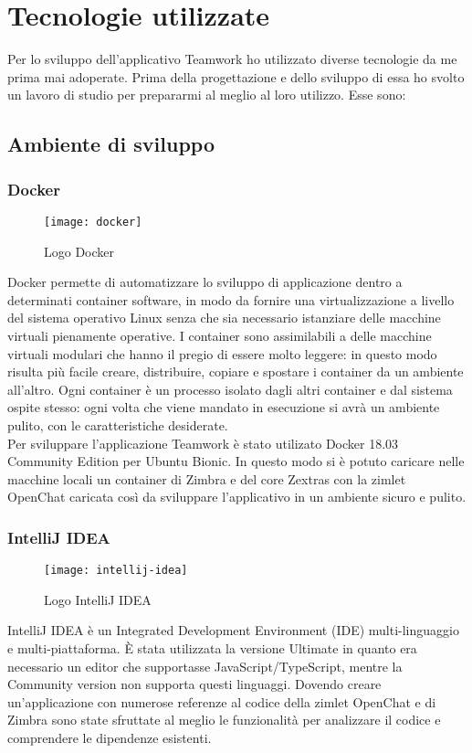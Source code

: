
\chapter{Tecnologie utilizzate}\label{chap:tec}
Per lo sviluppo dell'applicativo Teamwork ho utilizzato diverse tecnologie da me prima mai adoperate. Prima della progettazione e dello sviluppo di essa ho svolto un lavoro di studio per prepararmi al meglio al loro utilizzo. Esse sono:

\section{Ambiente di sviluppo}
\subsection{Docker}
\begin{figure}[H] 
	\centering
	\texttt{[image: docker]}
	\caption{Logo Docker}
\end{figure}
Docker permette di automatizzare lo sviluppo di applicazione dentro a determinati container software, 
in modo da fornire una virtualizzazione a livello del sistema operativo Linux senza che sia necessario 
istanziare delle macchine virtuali pienamente operative.
I container sono assimilabili a delle macchine virtuali modulari che hanno il pregio di essere molto 
leggere: in questo modo risulta più facile  creare, distribuire, copiare e spostare i container da un 
ambiente all'altro.
Ogni container è un processo isolato dagli altri container e dal sistema ospite stesso:  ogni volta che 
viene mandato in esecuzione si avrà un ambiente pulito, con le caratteristiche desiderate. \\
Per sviluppare l'applicazione Teamwork è stato utilizato Docker 18.03 Community Edition per Ubuntu 
Bionic. In questo modo si è potuto caricare nelle macchine locali un container di Zimbra e del core 
Zextras con la zimlet OpenChat caricata così da sviluppare l'applicativo in un ambiente sicuro e pulito.

\subsection{IntelliJ IDEA}
\begin{figure}[H] 
	\centering
	\texttt{[image: intellij-idea]}
	\caption{Logo IntelliJ IDEA}
\end{figure}
IntelliJ IDEA è un Integrated Development Environment (IDE) multi-linguaggio e multi-piattaforma. 
È stata utilizzata la versione Ultimate in quanto era necessario un editor che supportasse  
JavaScript/TypeScript, mentre la Community version non supporta questi linguaggi. 
Dovendo creare un'applicazione con numerose referenze al codice della zimlet OpenChat e di Zimbra 
sono state sfruttate al meglio le funzionalità per analizzare il codice e comprendere le 
dipendenze esistenti.

